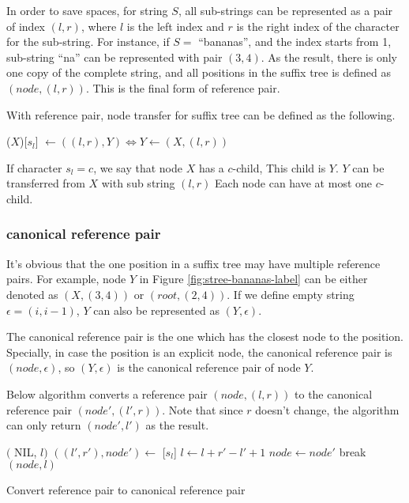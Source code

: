 \documentclass{article}
\begin{document}
In order to save spaces, for string $S$, all sub-strings can
be represented as a pair of index $(l, r)$, where $l$ is the left index and $r$ is the
right index of the character for the sub-string. For instance, if $S=$ ``bananas'', and the
index starts from 1, sub-string ``na'' can be represented with pair $(3, 4)$. As the result,
there is only one copy of the complete string, and all positions in the suffix tree
is defined as $(node, (l, r))$. This is the final form of reference pair.

With reference pair, node transfer for suffix tree can be defined as the following.

($X$)[$s_l$] $\gets ((l, r), Y) \iff Y \gets (X, (l, r))$

If character $s_l=c$, we say that node $X$ has a $c$-child, This child is $Y$.
$Y$ can be transferred from $X$ with sub string $(l, r)$
Each node can have at most one $c$-child.

\subsubsection{canonical reference pair}

It's obvious that the one position in a suffix tree may have multiple reference pairs.
For example, node $Y$ in Figure \ref{fig:stree-bananas-label} can be either
denoted as $(X, (3, 4))$ or $(root, (2, 4))$. If we define empty string
$\epsilon=(i, i-1)$, $Y$ can also be represented as $(Y, \epsilon)$.

The canonical reference pair is the one which has the closest node
to the position. Specially, in case the position is an
explicit node, the canonical reference pair is $(node, \epsilon)$, so $(Y, \epsilon)$
is the canonical reference pair of node $Y$.

Below algorithm converts a reference pair $(node, (l, r))$
to the canonical reference pair $(node', (l', r))$.
Note that since $r$ doesn't change, the algorithm can only return
$(node', l')$ as the result.

\begin{algorithm}
\begin{algorithmic}[1]
      \State \Return $($ NIL, $l)$
    \Else
      \State \Return {}
    \EndIf
  \EndIf
   
    \State $((l', r'), node') \gets$ [$s_l$]
      \State $l \gets l + r' - l' + 1$ 
      \State $node \gets node'$
    \Else
      \State break
    \EndIf
  \EndWhile
  \State \Return $(node, l)$
\EndFunction
\end{algorithmic}
\caption{Convert reference pair to canonical reference pair}
\label{algo:canon}
\end{algorithm}
\end{document}
